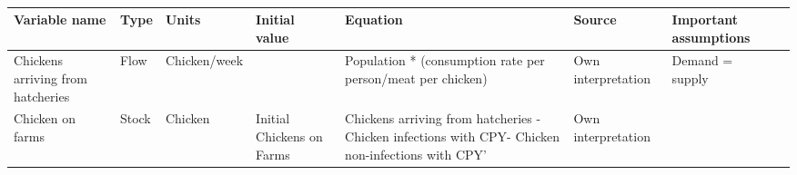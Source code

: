 \begin{landscape}
\begin{longtable}[c]{m{10em}lllm{15em}lll}
\caption{}
\label{tab:my-table}\\
Variable name                                 & Type     & Units                    & Initial value             & Equation                                                                                                                                                                                                                                                                                 & Source                                                                                                                                                                                       & Important assumptions                                                                                                                                                                                                                 \\
\endfirsthead
%
\endhead
%
Chickens arriving from hatcheries             & Flow     & Chicken/week             &                           & Population * (consumption rate per person/meat per chicken)                                                                                                                                                                                                                              & Own interpretation                                                                                                                                                                           & Demand = supply                                                                                                                                                                                                                       \\
Chicken on farms                              & Stock    & Chicken                  & Initial Chickens on Farms & Chickens arriving from hatcheries - Chicken infections with CPY- Chicken non-infections with CPY'                                                                                                                                                                                        & Own interpretation                                                                                                                                                                           &                                                                                                                                                                                                                                       \\

\end{longtable}
\end{landscape}
